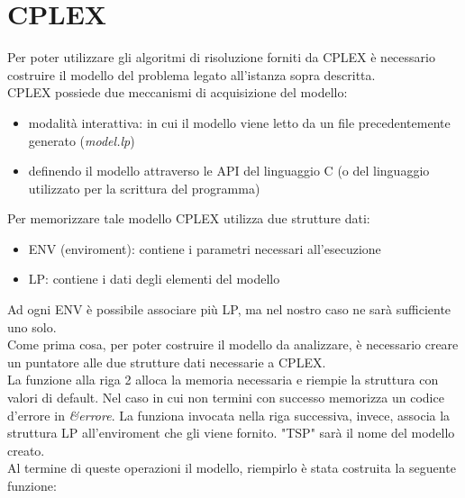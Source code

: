 \chapter{CPLEX}

Per poter utilizzare gli algoritmi di risoluzione forniti da CPLEX è necessario costruire il modello del problema legato all'istanza sopra descritta.\\
CPLEX possiede due meccanismi di acquisizione del modello:

\begin{itemize}
\item{modalità interattiva: in cui il modello viene letto da un file precedentemente generato (\textit{model.lp})}
\item{definendo il modello attraverso le API del linguaggio C (o del linguaggio utilizzato per la scrittura del programma)}
\end{itemize}

Per memorizzare tale modello CPLEX utilizza due strutture dati:

\begin{itemize}
\item{ENV (enviroment): contiene i parametri necessari all'esecuzione}
\item{LP: contiene i dati degli elementi del modello}
\end{itemize}


Ad ogni ENV è possibile associare più LP, ma nel nostro caso ne sarà sufficiente uno solo.\\

Come prima cosa, per poter costruire il modello da analizzare, è necessario creare un puntatore alle due strutture dati necessarie a CPLEX.\\



La funzione alla riga 2 alloca la memoria necessaria e riempie la struttura con valori di default. Nel caso in cui non termini con successo memorizza un codice d'errore in \textit{\&errore}. La funziona invocata nella riga successiva, invece, associa la struttura LP all'enviroment che gli viene fornito. "TSP" sarà il nome del modello creato.\\
Al termine di queste operazioni il modello, riempirlo è stata costruita la seguente funzione:\\

